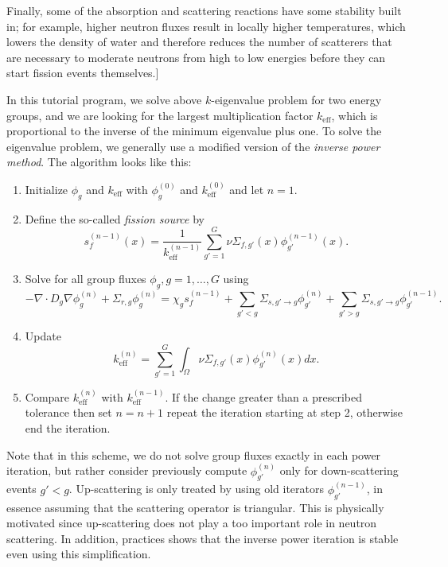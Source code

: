 \documentclass{article}
\begin{document}
Finally, some of the absorption and scattering reactions have some
stability built in; for example, higher neutron fluxes result in locally
higher temperatures, which lowers the density of water and therefore reduces
the number of scatterers that are necessary to moderate neutrons from high to
low energies before they can start fission events themselves.]

In this tutorial program, we solve above $k$-eigenvalue problem for two energy
groups, and we are looking for the largest multiplication factor
$k_{\mathrm{eff}}$, which is proportional to the inverse of the minimum
eigenvalue plus one. To solve the eigenvalue problem, we generally
use a modified version of the \emph{inverse power method}. The algorithm looks
like this:

\begin{enumerate}
\item Initialize $\phi_g$ and $k_{\mathrm{eff}}$ with $\phi_g^{(0)}$
  and $k_{\mathrm{eff}}^{(0)}$ and let $n=1$. 

\item Define the so-called \textit{fission source} by
  \begin{equation}
    s_f^{(n-1)}(x)
    =
    \frac{1}{k_{\mathrm{eff}}^{(n-1)}}
    \sum_{g'=1}^G\nu\Sigma_{f,g'}(x)\phi_{g'}^{(n-1)}(x).
  \end{equation}

\item Solve for all group fluxes $\phi_g,g=1,\ldots,G$ using
  \begin{equation}
    -\nabla \cdot D_g\nabla \phi_g^{(n)}
    +
    \Sigma_{r,g}\phi_g^{(n)}
    = 
    \chi_g s_f^{(n-1)}
    + 
    \sum_{g'< g} \Sigma_{s,g'\to g} \phi_{g'}^{(n)}
    +
    \sum_{g'> g}\Sigma_{s,g'\to g}\phi_{g'}^{(n-1)}.
  \end{equation}

\item Update
  \begin{equation}
    k_{\mathrm{eff}}^{(n)}
    =
    \sum_{g'=1}^G
    \int_{\Omega}\nu\Sigma_{f,g'}(x)
    \phi_{g'}^{(n)}(x)dx.
  \end{equation}

\item Compare $k_{\mathrm{eff}}^{(n)}$ with $k_{\mathrm{eff}}^{(n-1)}$.
  If the change greater than a prescribed tolerance then set $n=n+1$ repeat
  the iteration starting at step 2, otherwise end the iteration.
\end{enumerate}

Note that in this scheme, we do not solve group fluxes exactly in each power
iteration, but rather consider previously compute $\phi_{g'}^{(n)}$ only for
down-scattering events $g'<g$. Up-scattering is only treated by using old
iterators $\phi_{g'}^{(n-1)}$, in essence assuming that the scattering
operator is triangular. This is physically motivated since up-scattering does
not play a too important role in neutron scattering. In addition, practices
shows that the inverse power iteration is stable even using this
simplification.
\end{document}
